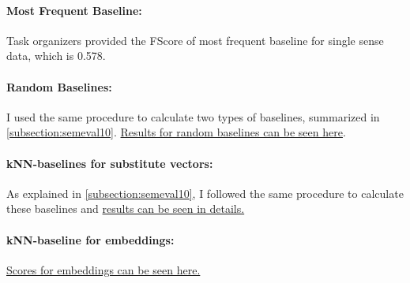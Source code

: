 \paragraph{Most Frequent Baseline:} Task organizers provided the FScore of most frequent baseline for single sense data, which is 0.578.
\paragraph{Random Baselines:} I used the same procedure to calculate two types of baselines, summarized in \ref{subsection:semeval10}.  \href{http://goo.gl/f2X0da}{Results for random baselines can be seen here}.
\paragraph{kNN-baselines for substitute vectors:} As explained in \ref{subsection:semeval10}, I followed the same procedure to calculate these baselines and \href{http://goo.gl/J88G7R}{results can be seen in details.}
\paragraph{kNN-baseline for embeddings:} \href{link}{Scores for embeddings can be seen here.}
